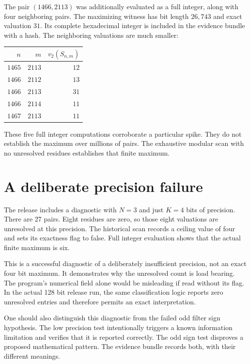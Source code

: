 The pair $(1466,2113)$ was additionally evaluated as a full integer, along
with four neighboring pairs. The maximizing witness has bit length
$26{,}743$ and exact valuation $31$. Its complete hexadecimal integer is
included in the evidence bundle with a hash. The neighboring valuations
are much smaller:
\begin{center}
\begin{tabular}{@{}rrr@{}}
\toprule
$n$ & $m$ & $v_2(S_{n,m})$\\
\midrule
$1465$ & $2113$ & $12$\\
$1466$ & $2112$ & $13$\\
$1466$ & $2113$ & $31$\\
$1466$ & $2114$ & $11$\\
$1467$ & $2113$ & $11$\\
\bottomrule
\end{tabular}
\end{center}
These five full integer computations corroborate a particular spike.
They do not establish the maximum over millions of pairs. The exhaustive
modular scan with no unresolved residues establishes that finite maximum.

\section{A deliberate precision failure}

The release includes a diagnostic with $N=3$ and just $K=4$ bits of
precision. There are 27 pairs. Eight residues are zero, so those eight
valuations are unresolved at this precision. The historical scan records
a ceiling value of four and sets its exactness flag to false. Full integer
evaluation shows that the actual finite maximum is six.

This is a successful diagnostic of a deliberately insufficient precision,
not an exact four bit maximum. It demonstrates why the unresolved count
is load bearing. The program's numerical field alone would be misleading
if read without its flag. In the actual 128 bit release run, the same
classification logic reports zero unresolved entries and therefore
permits an exact interpretation.

One should also distinguish this diagnostic from the failed odd filter
sign hypothesis. The low precision test intentionally triggers a known
information limitation and verifies that it is reported correctly. The
odd sign test disproves a proposed mathematical pattern. The evidence
bundle records both, with their different meanings.

